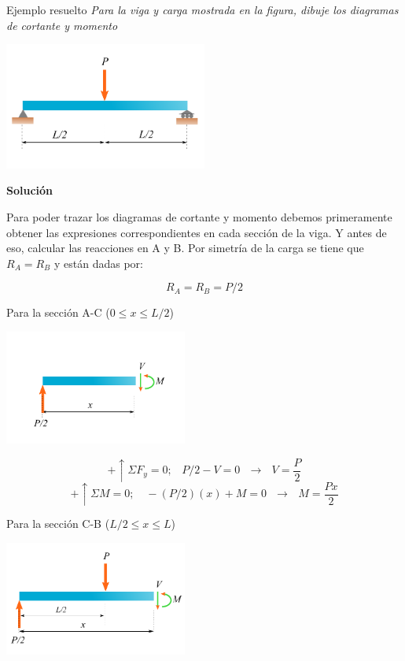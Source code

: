 \documentclass[12pt,letterpaper]{article}
\begin{document}
\begin{ejemplo}{Ejemplo resuelto}
\textit{Para la viga y carga mostrada en la figura, dibuje los diagramas de cortante y momento}

\begin{center}
\includegraphics[width=0.5\textwidth]{img/viga_01.pdf}
\end{center}

\textbf{Solución}

Para poder trazar los diagramas de cortante y momento debemos primeramente obtener las expresiones 
correspondientes en cada sección de la viga. Y antes de eso, calcular las reacciones en A y B. Por 
simetría de la carga se tiene que $R_A = R_B$ y están dadas por:

$$ R_A = R_B = P/2 $$

Para la sección A-C ($0 \leq x \leq L/2 $)

\begin{center}
\includegraphics[width=0.45\textwidth]{img/secc_01a.pdf}
\end{center}

$$ +\uparrow \Sigma F_y = 0; \,\,\,\,\, P/2 - V = 0  \,\,\,\, \rightarrow \,\,\,\, V = \frac{P}{2} $$
$$ +\uparrow \Sigma M = 0; \,\,\,\,\,\, -(P/2)(x) + M = 0  \,\,\,\, \rightarrow \,\,\,\, M = \frac{Px}{2} $$


Para la sección C-B ($ L/2 \leq x \leq L $)

\begin{center}
\includegraphics[width=0.45\textwidth]{img/secc_01b.pdf}
\end{center}


\end{ejemplo}
\end{document}

